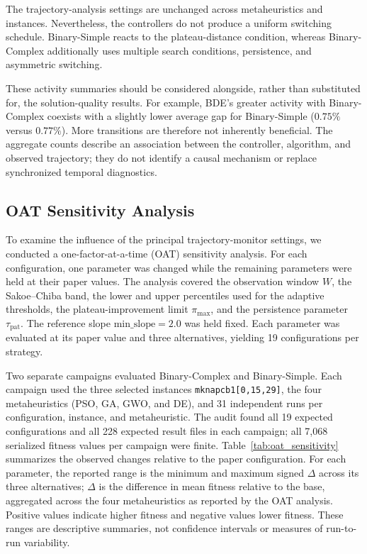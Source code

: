 \documentclass[journal,article,submit,moreauthors]{Definitions/mdpi}
\begin{document}
The trajectory-analysis settings are unchanged across metaheuristics and
instances. Nevertheless, the controllers do not produce a uniform
switching schedule. Binary-Simple reacts to the plateau-distance condition,
whereas Binary-Complex additionally uses multiple search conditions,
persistence, and asymmetric switching.

These activity summaries should be considered alongside, rather than
substituted for, the solution-quality results. For example, BDE's greater
activity with Binary-Complex coexists with a slightly lower average gap
for Binary-Simple ($0.75\%$ versus $0.77\%$). More transitions are therefore
not inherently beneficial. The aggregate counts describe an association
between the controller, algorithm, and observed trajectory; they do not
identify a causal mechanism or replace synchronized temporal diagnostics.

\subsection{OAT Sensitivity Analysis}
\label{subsec:oat_sensitivity}

To examine the influence of the principal trajectory-monitor settings, we
conducted a one-factor-at-a-time (OAT) sensitivity analysis. For each
configuration, one parameter was changed while the remaining parameters were
held at their paper values. The analysis covered the observation window
$W$, the Sakoe--Chiba band, the lower and upper percentiles used for the
adaptive thresholds, the plateau-improvement limit $\pi_{\max}$, and the
persistence parameter $\tau_{\mathrm{pat}}$. The reference slope
$\mathrm{min\_slope}=2.0$ was held fixed. Each parameter was evaluated at its
paper value and three alternatives, yielding 19 configurations per strategy.

Two separate campaigns evaluated Binary-Complex and Binary-Simple. Each
campaign used the three selected instances
\texttt{mknapcb1[0,15,29]}, the four metaheuristics (PSO, GA, GWO, and DE),
and 31 independent runs per configuration, instance, and metaheuristic. The
audit found all 19 expected configurations and all 228 expected result files
in each campaign; all 7,068 serialized fitness values per campaign were
finite. Table~\ref{tab:oat_sensitivity} summarizes the observed changes
relative to the paper configuration. For each parameter, the reported range
is the minimum and maximum signed $\Delta$ across its three alternatives;
$\Delta$ is the difference in mean fitness relative to the base, aggregated
across the four metaheuristics as reported by the OAT analysis. Positive
values indicate higher fitness and negative values lower fitness. These
ranges are descriptive summaries, not confidence intervals or measures of
run-to-run variability.
\end{document}
